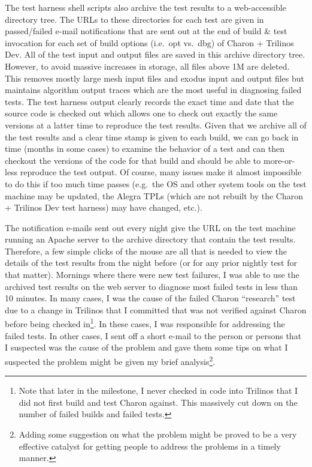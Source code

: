 \documentclass[pdf,ps2pdf,11pt]{SANDreport}
\begin{document}
The test harness shell scripts also archive the test results to a
web-accessible directory tree.  The URLs to these directories for each test
are given in passed/failed e-mail notifications that are sent out at the end
of build \& test invocation for each set of build options (i.e.\ opt vs.\ dbg)
of Charon + Trilinos Dev.  All of the test input and output files are saved in
this archive directory tree.  However, to avoid massive increases in storage,
all files above 1M are deleted.  This removes mostly large mesh input files
and exodus input and output files but maintains algorithm output traces which
are the most useful in diagnosing failed tests.  The test harness output
clearly records the exact time and date that the source code is checked out
which allows one to check out exactly the same versions at a latter time to
reproduce the test results.  Given that we archive all of the test results and
a clear time stamp is given to each build, we can go back in time (months in
some cases) to examine the behavior of a test and can then checkout the
versions of the code for that build and should be able to more-or-less
reproduce the test output.  Of course, many issues make it almost impossible
to do this if too much time passes (e.g.\ the OS and other system tools on the
test machine may be updated, the Alegra TPLs (which are not rebuilt by the
Charon + Trilinos Dev test harness) may have changed, etc.).

The notification e-mails sent out every night give the URL on the test machine
running an Apache server to the archive directory that contain the test
results.  Therefore, a few simple clicks of the mouse are all that is needed
to view the details of the test results from the night before (or for any
prior nightly test for that matter).  Mornings where there were new test
failures, I was able to use the archived test results on the web server to
diagnose most failed tests in less than 10 minutes.  In many cases, I was the
cause of the failed Charon ``research'' test due to a change in Trilinos that
I committed that was not verified against Charon before being checked
in\footnote{Note that later in the milestone, I never checked in code into
Trilinos that I did not first build and test Charon against.  This massively
cut down on the number of failed builds and failed tests.}.  In these cases, I
was responsible for addressing the failed tests.  In other cases, I sent off a
short e-mail to the person or persons that I suspected was the cause of the
problem and gave them some tips on what I suspected the problem might be given
my brief analysis\footnote{Adding some suggestion on what the problem might be
proved to be a very effective catalyst for getting people to address the
problems in a timely manner.}.
\end{document}
